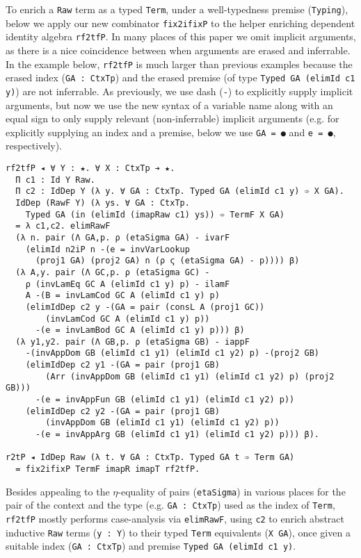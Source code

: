 \documentclass[acmsmall]{acmart}\settopmatter{}
\begin{document}
To enrich a \verb;Raw; term as a typed \verb;Term;, under a
well-typedness premise (\verb;Typing;), below we apply our new
combinator \verb;fix2ifixP; to the helper enriching dependent identity
algebra \verb;rf2tfP;. In many places of this paper we omit implicit
arguments, as there is a nice coincidence between when arguments are
erased and inferrable. In the example below, \verb;rf2tfP; is much
larger than previous examples because the erased index
(\verb;GA : CtxTp;) and the erased premise (of type
\verb;Typed GA (elimId c1 y);) are not inferrable. As previously, we
use dash (\verb;-;) to explicitly supply implicit arguments, but now
we use the new syntax of a variable name along with an equal sign to
only supply relevant (non-inferrable) implicit arguments
(e.g. for explicitly supplying an index and a premise,
below we use \verb;GA = ●; and \verb;e = ●;, respectively). 
\begin{verbatim}
rf2tfP ◂ ∀ Y : ★. ∀ X : CtxTp ➔ ★.
  Π c1 : Id Y Raw.
  Π c2 : IdDep Y (λ y. ∀ GA : CtxTp. Typed GA (elimId c1 y) ➾ X GA).
  IdDep (RawF Y) (λ ys. ∀ GA : CtxTp.
    Typed GA (in (elimId (imapRaw c1) ys)) ➾ TermF X GA)
  = λ c1,c2. elimRawF
  (λ n. pair (Λ GA,p. ρ (etaSigma GA) - ivarF
    (elimId n2iP n -(e = invVarLookup
      (proj1 GA) (proj2 GA) n (ρ ς (etaSigma GA) - p)))) β)
  (λ A,y. pair (Λ GC,p. ρ (etaSigma GC) - 
    ρ (invLamEq GC A (elimId c1 y) p) - ilamF
    A -(B = invLamCod GC A (elimId c1 y) p)
    (elimIdDep c2 y -(GA = pair (consL A (proj1 GC))
        (invLamCod GC A (elimId c1 y) p))
      -(e = invLamBod GC A (elimId c1 y) p))) β)
  (λ y1,y2. pair (Λ GB,p. ρ (etaSigma GB) - iappF 
    -(invAppDom GB (elimId c1 y1) (elimId c1 y2) p) -(proj2 GB)
    (elimIdDep c2 y1 -(GA = pair (proj1 GB)
        (Arr (invAppDom GB (elimId c1 y1) (elimId c1 y2) p) (proj2 GB)))
      -(e = invAppFun GB (elimId c1 y1) (elimId c1 y2) p))
    (elimIdDep c2 y2 -(GA = pair (proj1 GB)
        (invAppDom GB (elimId c1 y1) (elimId c1 y2) p))
      -(e = invAppArg GB (elimId c1 y1) (elimId c1 y2) p))) β).

r2tP ◂ IdDep Raw (λ t. ∀ GA : CtxTp. Typed GA t ➾ Term GA)
  = fix2ifixP TermF imapR imapT rf2tfP.
\end{verbatim}
Besides appealing to the $\eta$-equality of pairs (\verb;etaSigma;)
in various places for the pair of the context and the type
(e.g. \verb;GA : CtxTp;) used as the index of \verb;Term;,
\verb;rf2tfP; mostly performs case-analysis via \verb;elimRawF;, using
\verb;c2; to enrich abstract inductive \verb;Raw; terms (\verb;y : Y;)
to their typed \verb;Term; equivalents
(\verb;X GA;), once given a suitable index (\verb;GA : CtxTp;) and premise
\verb;Typed GA (elimId c1 y);.
\end{document}
